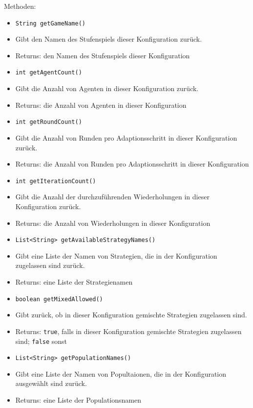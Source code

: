 \documentclass[parskip=full,11pt]{scrartcl}
\begin{document}
Methoden:
\begin{itemize}\itemsep -10pt
	\item \texttt{String getGameName()}
	\item[] Gibt den Namen des Stufenspiels dieser Konfiguration zurück.
	\item[] Returns: den Namen des Stufenspiels dieser Konfiguration
	
	\item \texttt{int getAgentCount()}
	\item[] Gibt die Anzahl von Agenten in dieser Konfiguration zurück.
	\item[] Returns: die Anzahl von Agenten in dieser Konfiguration
	
	\item \texttt{int getRoundCount()}
	\item[] Gibt die Anzahl von Runden pro Adaptionsschritt in dieser Konfiguration zurück.
	\item[] Returns: die Anzahl von Runden pro Adaptionsschritt in dieser Konfiguration
	
	\item \texttt{int getIterationCount()}
	\item[] Gibt die Anzahl der durchzuführenden Wiederholungen in dieser Konfiguration zurück.
	\item[] Returns: die Anzahl von Wiederholungen in dieser Konfiguration
	
	\item \texttt{List<String> getAvailableStrategyNames()}
	\item[] Gibt eine Liste der Namen von Strategien, die in der Konfiguration zugelassen sind zurück.
	\item[] Returns: eine Liste der Strategienamen
	
	\item \texttt{boolean getMixedAllowed()}
	\item[] Gibt zurück, ob in dieser Konfiguration gemischte Strategien zugelassen sind.
	\item[] Returns: \texttt{true}, falls in dieser Konfiguration gemischte Strategien zugelassen sind; \texttt{false} sonst
	
	\item \texttt{List<String> getPopulationNames()}
	\item[] Gibt eine Liste der Namen von Popultaionen, die in der Konfiguration ausgewählt sind zurück.
	\item[] Returns: eine Liste der Populationsnamen
	

\end{itemize}
\end{document}
